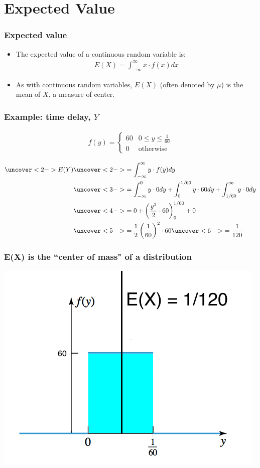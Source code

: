 \documentclass[handout]{beamer}\usepackage[]{graphicx}\usepackage[]{color}
\numberwithin{equation}{section}
\begin{document}
\section{Expected Value}

\begin{frame}
\frametitle{Expected value}
\begin{itemize}
\pause \item The expected value of a continuous random variable is:
\pause \begin{align*}
E(X) = \int_{-\infty}^\infty x \cdot f(x) dx
\end{align*}
\pause \item As with continuous random variables, $E(X)$ (often denoted by $\mu$) is the mean of $X$, a measure of center.
\end{itemize}
\end{frame}

\begin{frame}
\frametitle{Example: time delay, $Y$}

\begin{align*}
f(y) = \begin{cases}
60 & 0 \le y \le \frac{1}{60} \\
0 & \text{otherwise}
\end{cases}
\end{align*}

\begin{align*}
\uncover<2->{E(Y)} &\uncover<2->{= \int_{-\infty}^\infty y \cdot f(y) dy }\\
&\uncover<3->{= \int_{-\infty}^0 y \cdot  0 dy + \int_{0}^{1/60} y \cdot 60 dy + \int_{1/60}^\infty y \cdot 0 dy} \\
&\uncover<4->{= 0 + \left ( \frac{y^2}{2} \cdot 60 \right )_0^{1/60} + 0} \\
&\uncover<5->{= \frac{1}{2}  \left (\frac{1}{60} \right)^2 \cdot 60} \uncover<6->{ = \frac{1}{120}}
\end{align*}
\end{frame}

\begin{frame}
\frametitle{E(X) is the ``center of mass" of a distribution}
 \includegraphics{../../fig/delaypictwex.png}
\end{frame}
\end{document}
